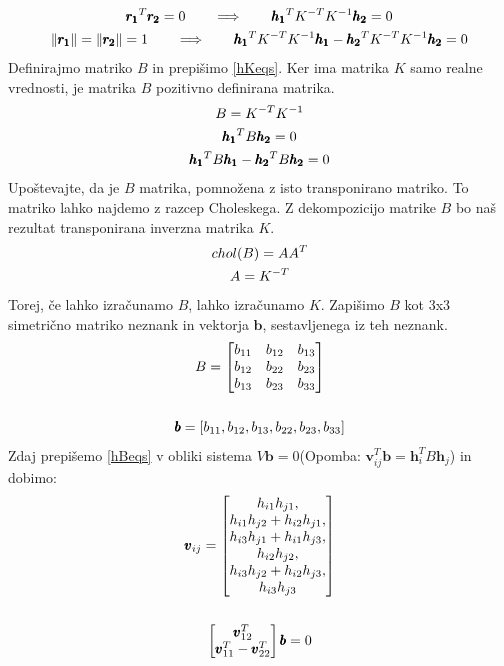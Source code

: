 \begin{gather}
    \pmb{r_1}^T \pmb{r_2}=0 \qquad \Longrightarrow \qquad \pmb{h_1}^TK^{-T}K^{-1}\pmb{h_2}=0    \notag\\
    \|\pmb{r_1}\|=\|\pmb{r_2}\|=1 \qquad \Longrightarrow \qquad \pmb{h_1}^T K^{-T}K^{-1}\pmb{h_1}-\pmb{h_2}^TK^{-T}K^{-1}\pmb{h_2}=0
    \label{hKeqs}
\end{gather}
Definirajmo matriko $B$ in prepišimo \ref{hKeqs}. Ker ima matrika $K$ samo realne vrednosti, je matrika $B$ pozitivno definirana matrika.
\begin{gather}
    B=K^{-T} K^{-1} \label{Bdef} \\
    \pmb{h_1}^T B \pmb{h_2}=0 \notag\\
    \pmb{h_1}^T B \pmb{h_1}-\pmb{h_2}^T B \pmb{h_2}=0
    \label{hBeqs}
\end{gather}
Upoštevajte, da je $B$ matrika, pomnožena z isto transponirano matriko. To matriko lahko najdemo z razcep Choleskega. Z dekompozicijo matrike $B$ bo naš rezultat transponirana inverzna matrika $K$.
\begin{gather}
    chol(B)=A A^T   \notag\\
    A=K^{-T}
    \label{cholesky}
\end{gather}
Torej, če lahko izračunamo $B$, lahko izračunamo $K$. Zapišimo $B$ kot 3x3 simetrično matriko neznank in vektorja $\pmb{b}$, sestavljenega iz teh neznank.
\begin{gather}
    B = \begin{bmatrix}
        b_{11} & b_{12} & b_{13} \\
        b_{12} & b_{22} & b_{23} \\
        b_{13} & b_{23} & b_{33} \\
    \end{bmatrix}   \notag\\\notag\\
    \pmb{b} = [b_{11}, b_{12}, b_{13}, b_{22}, b_{23}, b_{33}]\notag
\end{gather}
Zdaj prepišemo \ref{hBeqs} v obliki sistema $V\pmb{b}=0$(Opomba: $\pmb{v}_{ij}^T \pmb{b}=\pmb{h}_i^T B \pmb{h}_j$) in dobimo:
\begin{gather}
    \pmb{v}_{ij} = \begin{bmatrix}
        h_{i1}h_{j1},   \\
        h_{i1}h_{j2}+h_{i2}h_{j1},  \\
        h_{i3}h_{j1}+h_{i1}h_{j3},  \\
        h_{i2}h_{j2},   \\
        h_{i3}h_{j2}+h_{i2}h_{j3},  \\
        h_{i3}h_{j3}    
    \end{bmatrix}   \notag\\
    \notag\\
    \begin{bmatrix}
        \pmb{v}_{12}^T \\
        \pmb{v}_{11}^T-\pmb{v}_{22}^T
    \end{bmatrix}
    \pmb{b}=0
    \label{vsistem}
\end{gather}

